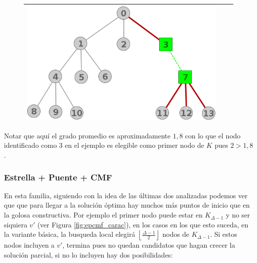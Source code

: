 \begin{figure}[H]
\begin{center}
\begin{tabular}{|c||c||c|}
			\includegraphics[scale = 0.2]{img/ej3/busqueda_local/extremetree_st12.png} \\
		\hline
		\end{tabular}
	\end{center}
\end{figure}
Notar que aqu\'i el grado promedio es aproximadamente $1,8$ con lo que 
el nodo identificado como $3$ en el ejemplo es elegible como
primer nodo de $K$ pues $2 > 1,8$.

\subsubsection{Estrella + Puente + CMF}

En esta familia, siguiendo con la idea de las \'ultimas dos analizadas
podemos ver que que para llegar a la soluci\'on \'optima hay muchos 
m\'as puntos de inicio que en la golosa constructiva. Por ejemplo
el primer nodo puede estar en $K_{\Delta -1}$ y no ser siquiera $v'$ 
(ver Figura \ref{fig:epcmf_carac}), en los casos en los que esto 
suceda, en la variante b\'asica, la busqueda local elegir\'a
$\left\lfloor \frac{\Delta -1}{2} \right\rfloor$ nodos de $K_{\Delta -1}$. 
Si estos nodos incluyen a $v'$, termina pues no quedan candidatos que
hagan crecer la soluci\'on parcial, si no lo incluyen hay dos posibilidades:

